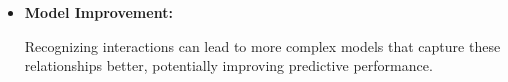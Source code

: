 \documentclass[12pt]{article}
\begin{document}
\begin{itemize}
\begin{itemize}
			
				
			
				\item{\textbf{Model Improvement: }}
				
				Recognizing interactions can lead to more complex models that capture these relationships better, potentially improving predictive performance.
			
				

			\end{itemize}
		\end{itemize}	
\end{document}
